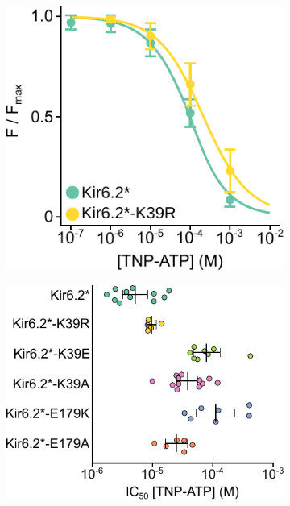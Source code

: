 \begin{figure}[h]
\begin{subfigure}[t]{0.45\textwidth}
	\end{subfigure}
	\hfill
	\begin{subfigure}[t]{0.45\textwidth}
		\caption{}\label{ch5fig:k39_drc_2}
		\centering
		\includegraphics[width=\textwidth]{k39_drc_2.pdf}
	\end{subfigure}
	\vfill
	\begin{subfigure}[t]{0.45\textwidth}
		\caption{}\label{ch5fig:k39_ic50s_1}
		\centering
		\includegraphics[width=\textwidth]{k39_ic50s_1.pdf}

\end{subfigure}
\end{figure}
